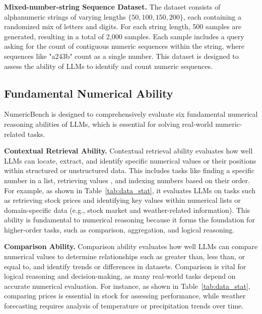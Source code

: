 \noindent\textbf{Mixed-number-string Sequence Dataset.}
The dataset consists of alphanumeric strings of varying lengths $\{50, 100, 150, 200\}$, each containing a randomized mix of letters and digits. For each string length, 500 samples are generated, resulting in a total of 2,000 samples. Each sample includes a query asking for the count of contiguous numeric sequences within the string, where sequences like "a243b" count as a single number. This dataset is designed to assess the ability of LLMs to identify and count numeric sequences.
 







\subsection{Fundamental Numerical Ability}
NumericBench is designed to comprehensively evaluate six fundamental numerical reasoning abilities of LLMs, which is 
essential for solving real-world numeric-related tasks.


\noindent\textbf{Contextual Retrieval Ability.}
Contextual retrieval ability evaluates how well LLMs can locate, extract, and identify specific numerical values or their positions within structured or unstructured data. 
This includes tasks like finding a specific number in a list, retrieving values , and indexing numbers based on their order.
For example, as shown in Table~\ref{tab:data_stat}, it evaluates LLMs on tasks such as retrieving stock prices and identifying key values within numerical lists or domain-specific data (e.g., stock market and weather-related information).
This ability is fundamental to numerical reasoning because it forms the foundation for higher-order tasks, such as comparison, aggregation, and logical reasoning. 
 
 



\noindent\textbf{Comparison Ability.}
Comparison ability evaluates how well LLMs can compare numerical values to determine relationships such as greater than, less than, or equal to, and identify trends or differences in datasets. 
Comparison is vital for logical reasoning and decision-making, as many real-world tasks depend on accurate numerical evaluation. 
For instance,  as shown in Table~\ref{tab:data_stat},   comparing prices is essential in stock  for assessing performance, while weather forecasting requires analysis of temperature or precipitation trends over time. 
 



